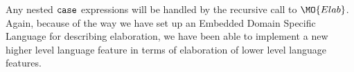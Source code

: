 Any nested $\mathtt{case}$ expressions will be handled by the recursive call to
$\MO{Elab}$. Again, because of the way we have set up an Embedded Domain Specific
Language for describing elaboration, we have been able to implement a new higher
level language feature in terms of elaboration of lower level language features.






